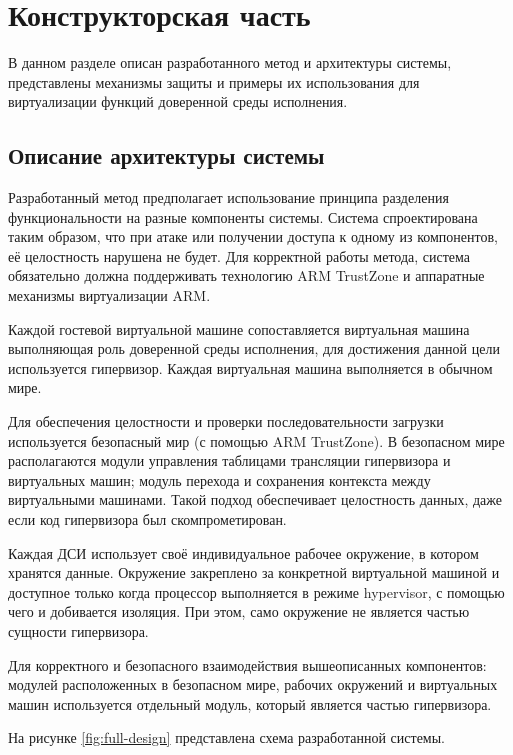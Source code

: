 \section{Конструкторская часть}

В данном разделе описан разработанного метод и архитектуры системы, представлены механизмы защиты и примеры их использования для виртуализации функций доверенной среды исполнения.

\subsection{Описание архитектуры системы}

Разработанный метод предполагает использование принципа разделения функциональности на разные компоненты системы. Система спроектирована таким образом, что при атаке или получении доступа к одному из компонентов, её целостность нарушена не будет. Для корректной работы метода, система обязательно должна поддерживать технологию ARM TrustZone и аппаратные механизмы виртуализации ARM. 

Каждой гостевой виртуальной машине сопоставляется виртуальная машина выполняющая роль доверенной среды исполнения, для достижения данной цели используется гипервизор. Каждая виртуальная машина выполняется в обычном мире.

Для обеспечения целостности и проверки последовательности загрузки используется безопасный мир (с помощью ARM TrustZone). В безопасном мире располагаются модули управления таблицами трансляции гипервизора и виртуальных машин; модуль перехода и сохранения контекста между виртуальными машинами. Такой подход обеспечивает целостность данных, даже если код гипервизора был скомпрометирован.

Каждая ДСИ использует своё индивидуальное рабочее окружение, в котором хранятся данные. Окружение закреплено за конкретной виртуальной машиной и доступное только когда процессор выполняется в режиме hypervisor, с помощью чего и добивается изоляция. При этом, само окружение не является частью сущности гипервизора.

Для корректного и безопасного взаимодействия вышеописанных компонентов: модулей расположенных в безопасном мире, рабочих окружений и виртуальных машин используется отдельный модуль, который является частью гипервизора.

На рисунке \ref{fig:full-design} представлена схема разработанной системы.

